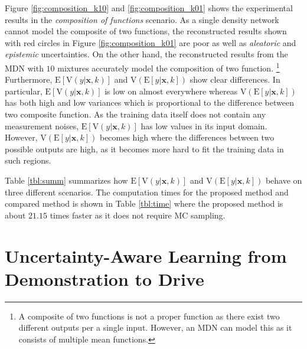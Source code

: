\documentclass[letterpaper, 10 pt, conference]{ieeeconf}  %
\def\Bx{\mathbf{x}} \def\By{\mathbf{y}} \def\Bp{\mathbf{p}}
\begin{document}
Figure \ref{fig:composition_k10} and \ref{fig:composition_k01}
shows the experimental results in the
\textit{composition of functions} scenario. 
As a single density network cannot model the composite of two 
functions, the reconstructed results shown with red circles 
in Figure \ref{fig:composition_k01} are poor as well as 
\textit{aleatoric} and \textit{epistemic} uncertainties. 
On the other hand, the reconstructed results from 
the MDN with $10$ mixtures 
accurately model the composition of two function. \footnote{
A composite of two functions is not a proper function as
there exist two different outputs per a single input. 
However, an MDN can model this as it
consists of multiple mean functions. 
}
Furthermore, 
$\mathrm{E}[\mathrm{V}(y|\Bx, k)]$
and $\mathrm{V}(\mathrm{E}[y|\Bx, k])$
show clear differences.
In particular, 
$\mathrm{E}[\mathrm{V}(y|\Bx, k)]$
is low on almost everywhere whereas 
$\mathrm{V}(\mathrm{E}[y|\Bx, k])$
has both high and low variances
which is proportional to the difference
between two composite function. 
As the training data itself does not contain 
any measurement noises,
$\mathrm{E}[\mathrm{V}(y|\Bx, k)]$
has low values in its input domain. 
However, 
$\mathrm{V}(\mathrm{E}[y|\Bx, k])$ becomes high 
where the differences between two possible outputs
are high, as it becomes more hard to fit the training data
in such regions. 

Table \ref{tbl:summ} summarizes how 
$\mathrm{E}[\mathrm{V}(y|\Bx, k)]$
and 
$\mathrm{V}(\mathrm{E}[y|\Bx, k])$
behave on three different scenarios. 
The computation times for the proposed method
and compared method \cite{Kendall_17} is shown in 
Table \ref{tbl:time} where the proposed method
is about $21.15$ times faster as it does not 
require MC sampling. 




\section{Uncertainty-Aware Learning from Demonstration to Drive} \label{sec:lfd}


\end{document}
